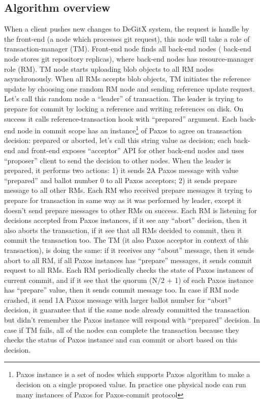 \documentclass[sigplan, screen, nonacm, 11pt]{acmart}
\begin{document}
\subsection{Algorithm overview}

When a client pushes new changes to DeGitX system, the request is handle by the front-end (a node which processes
git request), this node will take a role of transaction-manager (TM). Front-end node finds all back-end nodes (
back-end node stores git repository replicas), where back-end nodes has resource-manager role (RM).
TM node starts uploading blob objects to all RM nodes asynchronously. When all RMs accepts blob objects,
TM initiates the reference update by choosing one random RM node and sending reference update request.
Let's call this random node a ``leader'' of transaction. The leader is trying to prepare for commit by
locking a reference and writing references on disk. On success it calls reference-transaction hook with ``prepared''
argument. Each back-end node in commit scope has an instance\footnote{Paxos instance is a set of nodes
which supports Paxos algorithm to make a decision on a single proposed value. In practice one physical node
can run many instances of Paxos for Paxos-commit protocol} of Paxos to agree on transaction decision: prepared or aborted,
let's call this string value as decision;
each back-end and front-end exposes ``acceptor'' API for other back-end nodes and uses ``proposer'' client to send
the decision to other nodes. When the leader is prepared, it performs two actions: 1) it sends 2A Paxos message with value
``prepared'' and ballot number 0 to all Paxos acceptors; 2) it sends prepare message to all other RMs.
Each RM who received prepare messages it trying to prepare for transaction in same way as it was performed by leader,
except it doesn't send prepare messages to other RMs on success. Each RM is listening for decisions accepted from Paxos
instances, if it see any ``abort'' decision, then it also aborts the transaction, if it see that all RMs decided to commit,
then it commit the transaction too. The TM (it also Paxos acceptor in context of this transaction), is doing the same:
if it receives any ``about'' message, then it sends abort to all RM, if all Paxos instances has ``prepare'' messages,
it sends commit request to all RMs. Each RM periodically checks the state of Paxos instances of current commit, and if it see
that the quorum (N/2 + 1) of each Paxos instance has ``prepare'' value, then it sends commit message too.
In case if RM node crashed, it send 1A Paxos message with larger ballot number for ``abort'' decision, it guarantee
that if the same node already committed the transaction but didn't remember the Paxos instance will respond with
``prepared'' decision. In case if TM fails, all of the nodes can complete the transaction because they checks the status
of Paxos instance and can commit or abort based on this decision.
\end{document}
